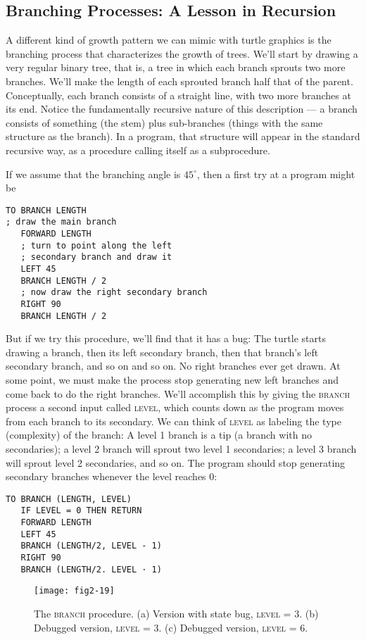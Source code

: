 \documentclass{book}
\begin{document}
\subsection{Branching Processes: A Lesson in Recursion}

A different kind of growth pattern we can mimic with turtle graphics
is the branching process that characterizes the growth of trees. We'll
start by drawing a very regular binary tree, that is, a tree in which
each branch sprouts two more branches. We'll make the length of each
sprouted branch half that of the parent. Conceptually, each branch
consists of a straight line, with two more branches at its end. Notice the
fundamentally recursive nature of this description --- a branch consists of
something (the stem) plus sub-branches (things with the same structure
as the branch). In a program, that structure will appear in the standard
recursive way, as a procedure calling itself as a subprocedure.

If we assume that the branching angle is $45^{\circ}$, then a first try at a
program might be

\begin{verbatim}
TO BRANCH LENGTH
; draw the main branch
   FORWARD LENGTH
   ; turn to point along the left
   ; secondary branch and draw it
   LEFT 45
   BRANCH LENGTH / 2
   ; now draw the right secondary branch
   RIGHT 90
   BRANCH LENGTH / 2
\end{verbatim}
But if we try this procedure, we'll find that it has a bug: The turtle starts
drawing a branch, then its left secondary branch, then that branch's
left secondary branch, and so on and so on. No right branches ever get
drawn. At some point, we must make the process stop generating new
left branches and come back to do the right branches. We'll accomplish
this by giving the \textsc{branch} process a second input called \textsc{level}, which
counts down as the program moves from each branch to its secondary.
We can think of \textsc{level} as labeling the type (complexity) of the branch:
A level 1 branch is a tip (a branch with no secondaries); a level 2 branch
will sprout two level 1 secondaries; a level 3 branch will sprout level 2
secondaries, and so on. The program should stop generating secondary
branches whenever the level reaches 0:

\begin{verbatim}
TO BRANCH (LENGTH, LEVEL)
   IF LEVEL = 0 THEN RETURN
   FORWARD LENGTH
   LEFT 45
   BRANCH (LENGTH/2, LEVEL - 1)
   RIGHT 90
   BRANCH (LENGTH/2. LEVEL · 1)
\end{verbatim}
\begin{figure}
\begin{center}
\texttt{[image: fig2-19]}
\caption{The \textsc{branch} procedure. (a) Version with state bug, \textsc{level} = 3. (b) Debugged version, \textsc{level} = 3. (c) Debugged version, \textsc{level} = 6.}
\end{center}
\end{figure}
\end{document}
